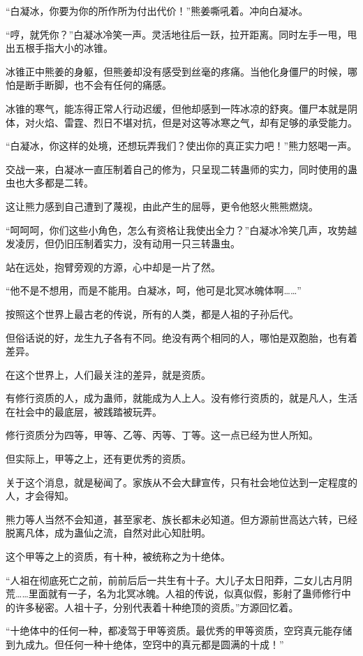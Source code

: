 \begin{this_body}
“白凝冰，你要为你的所作所为付出代价！”熊姜嘶吼着。冲向白凝冰。

“哼，就凭你？”白凝冰冷笑一声。灵活地往后一跃，拉开距离。同时左手一甩，甩出五根手指大小的冰锥。

冰锥正中熊姜的身躯，但熊姜却没有感受到丝毫的疼痛。当他化身僵尸的时候，哪怕是断手断脚，也不会有任何的痛感。

冰锥的寒气，能冻得正常人行动迟缓，但他却感到一阵冰凉的舒爽。僵尸本就是阴体，对火焰、雷霆、烈日不堪对抗，但是对这等冰寒之气，却有足够的承受能力。

“白凝冰，你这样的处境，还想玩弄我们？使出你的真正实力吧！”熊力怒喝一声。

交战一来，白凝冰一直压制着自己的修为，只呈现二转蛊师的实力，同时使用的蛊虫也大多都是二转。

这让熊力感到自己遭到了蔑视，由此产生的屈辱，更令他怒火熊熊燃烧。

“呵呵呵，你们这些小角色，怎么有资格让我使出全力？”白凝冰冷笑几声，攻势越发凌厉，但仍旧压制着实力，没有动用一只三转蛊虫。

站在远处，抱臂旁观的方源，心中却是一片了然。

“他不是不想用，而是不能用。白凝冰，呵，他可是北冥冰魄体啊……”

按照这个世界上最古老的传说，所有的人类，都是人祖的子孙后代。

但俗话说的好，龙生九子各有不同。绝没有两个相同的人，哪怕是双胞胎，也有着差异。

在这个世界上，人们最关注的差异，就是资质。

有修行资质的人，成为蛊师，就能成为人上人。没有修行资质的，就是凡人，生活在社会中的最底层，被践踏被玩弄。

修行资质分为四等，甲等、乙等、丙等、丁等。这一点已经为世人所知。

但实际上，甲等之上，还有更优秀的资质。

关于这个消息，就是秘闻了。家族从不会大肆宣传，只有社会地位达到一定程度的人，才会得知。

熊力等人当然不会知道，甚至家老、族长都未必知道。但方源前世高达六转，已经脱离凡体，成为蛊仙之流，自然对此心知肚明。

这个甲等之上的资质，有十种，被统称之为十绝体。

“人祖在彻底死亡之前，前前后后一共生有十子。大儿子太日阳莽，二女儿古月阴荒……里面就有一子，名为北冥冰魄。人祖的传说，似真似假，影射了蛊师修行中的许多秘密。人祖十子，分别代表着十种绝顶的资质。”方源回忆着。

“十绝体中的任何一种，都凌驾于甲等资质。最优秀的甲等资质，空窍真元能存储到九成九。但任何一种十绝体，空窍中的真元都是圆满的十成！”


\end{this_body}
